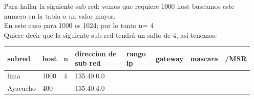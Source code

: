 Para hallar la siguiente sub red: vemos que requiere 1000 host buscamos este numero en la tabla o un valor mayor.
\\
En este caso para 1000 es 1024; por lo tanto n= 4\\
Quiere decir que la siguiente sub red tendr\'a un salto de 4, asi tenemos:

\begin{table}[htbp]
\begin{tabular}{@{}llllllll@{}}
\toprule
\rowcolor[HTML]{32CB00} 
\textbf{subred} & \textbf{host} & \textbf{n} & \textbf{direccion de sub red} & \textbf{rango ip} & \textbf{gateway} & \textbf{mascara} & \textbf{/MSR} \\ \midrule
lima            & 1000          & 4          & 135.40.0.0                    &                   &                  &                  &               \\ \midrule
Ayacucho        & 400           &            & 135.40.4.0                    &                   &                  &                  &              
\end{tabular}
\end{table}

